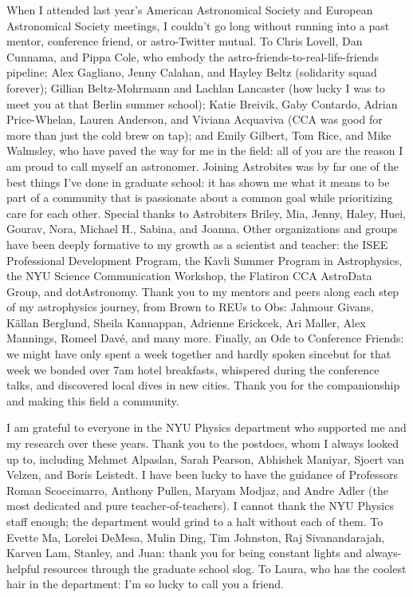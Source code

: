 When I attended last year's American Astronomical Society and European Astronomical Society meetings, I couldn't go long without running into a past mentor, conference friend, or astro-Twitter mutual.
To Chris Lovell, Dan Cunnama, and Pippa Cole, who embody the astro-friends-to-real-life-friends pipeline; Alex Gagliano, Jenny Calahan, and Hayley Beltz (solidarity squad forever); Gillian Beltz-Mohrmann and Lachlan Lancaster (how lucky I was to meet you at that Berlin summer school); Katie Breivik, Gaby Contardo, Adrian Price-Whelan, Lauren Anderson, and Viviana Acquaviva (CCA was good for more than just the cold brew on tap); and Emily Gilbert, Tom Rice, and Mike Walmsley, who have paved the way for me in the field: all of you are the reason I am proud to call myself an astronomer.
Joining Astrobites was by far one of the best things I've done in graduate school: it has shown me what it means to be part of a community that is passionate about a common goal while prioritizing care for each other. Special thanks to Astrobiters Briley, Mia, Jenny, Haley, Huei, Gourav, Nora, Michael H., Sabina, and Joanna.
Other organizations and groups have been deeply formative to my growth as a scientist and teacher: the ISEE Professional Development Program, the Kavli Summer Program in Astrophysics, the NYU Science Communication Workshop, the Flatiron CCA AstroData Group, and dotAstronomy. 
Thank you to my mentors and peers along each step of my astrophysics journey, from Brown to REUs to Obs: Jahmour Givans, K\"allan Berglund, Sheila Kannappan, Adrienne Erickcek,  Ari Maller, Alex Mannings, Romeel Dav\'e, and many more.
Finally, an Ode to Conference Friends: we might have only spent a week together and hardly spoken since{\emdash}but for that week we bonded over 7am hotel breakfasts, whispered during the conference talks, and discovered local dives in new cities.
Thank you for the companionship and making this field a community.

I am grateful to everyone in the NYU Physics department who supported me and my research over these years.
Thank you to the postdocs, whom I always looked up to, including Mehmet Alpaslan, Sarah Pearson, Abhishek Maniyar, Sjoert van Velzen, and Boris Leistedt.
I have been lucky to have the guidance of Professors Roman Scoccimarro, Anthony Pullen, Maryam Modjaz, and Andre Adler (the most dedicated and pure teacher-of-teachers).
I cannot thank the NYU Physics staff enough; the department would grind to a halt without each of them.
To Evette Ma, Lorelei DeMesa, Mulin Ding, Tim Johnston, Raj Sivanandarajah, Karven Lam, Stanley, and Juan: thank you for being constant lights and always-helpful resources through the graduate school slog.
To Laura, who has the coolest hair in the department: I'm so lucky to call you a friend.

